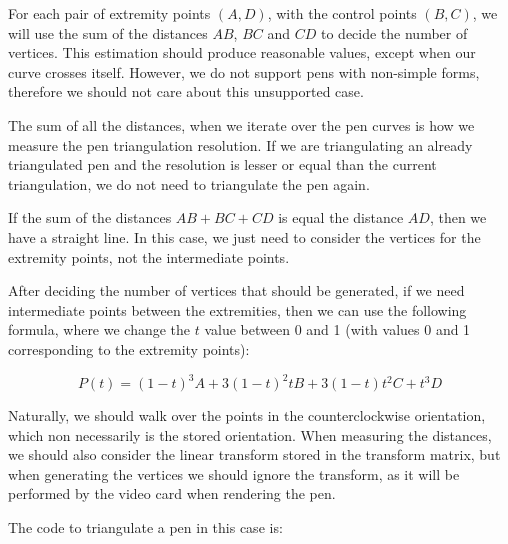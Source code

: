 {{{{{For each pair of extremity points $(A, D)$, with the control points
$(B, C)$, we will use the sum of the distances $AB$, $BC$ and $CD$ to
decide the number of vertices. This estimation should produce
reasonable values, except when our curve crosses itself. However, we
do not support pens with non-simple forms, therefore we should not
care about this unsupported case.

The sum of all the distances, when we iterate over the pen curves is
how we measure the pen triangulation resolution. If we are
triangulating an already triangulated pen and the resolution is lesser
or equal than the current triangulation, we do not need to triangulate
the pen again.

If the sum of the distances $AB+BC+CD$ is equal the distance $AD$,
then we have a straight line. In this case, we just need to consider
the vertices for the extremity points, not the intermediate points.

After deciding the number of vertices that should be generated, if we
need intermediate points between the extremities, then we can use the
following formula, where we change the $t$ value between 0 and 1 (with
values 0 and 1 corresponding to the extremity points):

$$
P(t) = (1-t)^3A + 3(1-t)^2tB + 3(1-t)t^2C + t^3D
$$

Naturally, we should walk over the points in the counterclockwise
orientation, which non necessarily is the stored orientation. When
measuring the distances, we should also consider the linear transform
stored in the transform matrix, but when generating the vertices we
should ignore the transform, as it will be performed by the video card
when rendering the pen.

The code to triangulate a pen in this case is:

}}}}}
